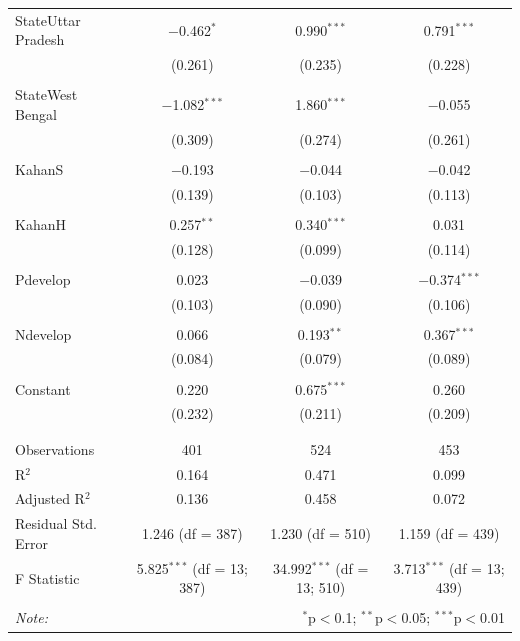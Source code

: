 \documentclass[
]{article}
\begin{document}
\begin{table}[!htbp]
\begin{tabular}{@{\extracolsep{5pt}}lccc}
 StateUttar Pradesh & $-$0.462$^{*}$ & 0.990$^{***}$ & 0.791$^{***}$ \\ 
  & (0.261) & (0.235) & (0.228) \\ 
  & & & \\ 
 StateWest Bengal & $-$1.082$^{***}$ & 1.860$^{***}$ & $-$0.055 \\ 
  & (0.309) & (0.274) & (0.261) \\ 
  & & & \\ 
 KahanS & $-$0.193 & $-$0.044 & $-$0.042 \\ 
  & (0.139) & (0.103) & (0.113) \\ 
  & & & \\ 
 KahanH & 0.257$^{**}$ & 0.340$^{***}$ & 0.031 \\ 
  & (0.128) & (0.099) & (0.114) \\ 
  & & & \\ 
 Pdevelop & 0.023 & $-$0.039 & $-$0.374$^{***}$ \\ 
  & (0.103) & (0.090) & (0.106) \\ 
  & & & \\ 
 Ndevelop & 0.066 & 0.193$^{**}$ & 0.367$^{***}$ \\ 
  & (0.084) & (0.079) & (0.089) \\ 
  & & & \\ 
 Constant & 0.220 & 0.675$^{***}$ & 0.260 \\ 
  & (0.232) & (0.211) & (0.209) \\ 
  & & & \\ 
\hline \\[-1.8ex] 
Observations & 401 & 524 & 453 \\ 
R$^{2}$ & 0.164 & 0.471 & 0.099 \\ 
Adjusted R$^{2}$ & 0.136 & 0.458 & 0.072 \\ 
Residual Std. Error & 1.246 (df = 387) & 1.230 (df = 510) & 1.159 (df = 439) \\ 
F Statistic & 5.825$^{***}$ (df = 13; 387) & 34.992$^{***}$ (df = 13; 510) & 3.713$^{***}$ (df = 13; 439) \\ 
\hline 
\hline \\[-1.8ex] 
\textit{Note:}  & \multicolumn{3}{r}{$^{*}$p$<$0.1; $^{**}$p$<$0.05; $^{***}$p$<$0.01} \\ 
\end{tabular} 
\end{table} 
\endgroup
\end{document}

